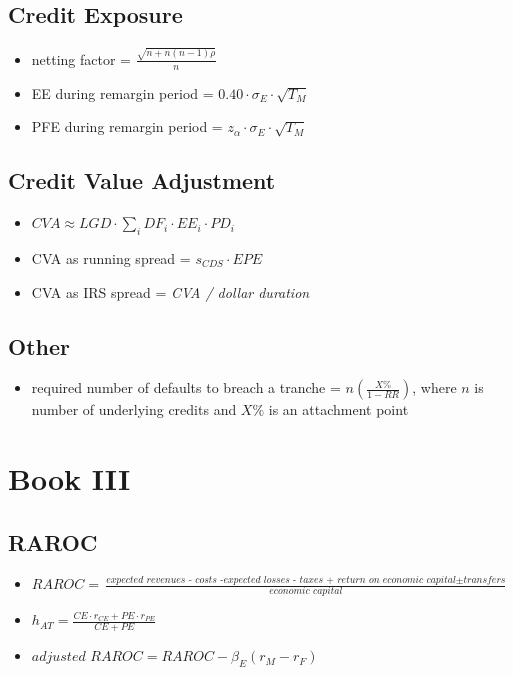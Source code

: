 \subsection{Credit Exposure}
\begin{itemize}
	\item netting factor = $\frac{\sqrt{n + n(n - 1)\rho}}{n}$
	\item EE during remargin period = $0.40 \cdot \sigma_E \cdot \sqrt{T_M}$
	\item PFE during remargin period = $z_{\alpha} \cdot \sigma_E \cdot \sqrt{T_M}$
\end{itemize}

\subsection{Credit Value Adjustment}
\begin{itemize}
	\item $CVA \approx LGD \cdot \sum_i DF_i \cdot EE_i \cdot PD_i$
	\item CVA as running spread = $s_{CDS} \cdot EPE$
	\item CVA as IRS spread = \textit{CVA / dollar duration}
\end{itemize}

\subsection{Other}
\begin{itemize}
	\item required number of defaults to breach a tranche = $n \left(\frac{X\%}{1 - RR}\right)$, where $n$ is number of underlying credits and $X\%$ is an attachment point
\end{itemize}

\section{Book III}

\subsection{RAROC}
\begin{itemize}
	\item $RAROC = \frac{\textit{expected revenues - costs -expected losses - taxes + return on economic capital} \pm \textit{transfers}}{\textit{economic capital}}$
	\item $h_{AT} = \frac{CE \cdot r_{CE} + PE \cdot r_{PE}}{CE + PE}$
	\item $\textit{adjusted RAROC} = RAROC - \beta_E (r_M - r_F)$
\end{itemize}

